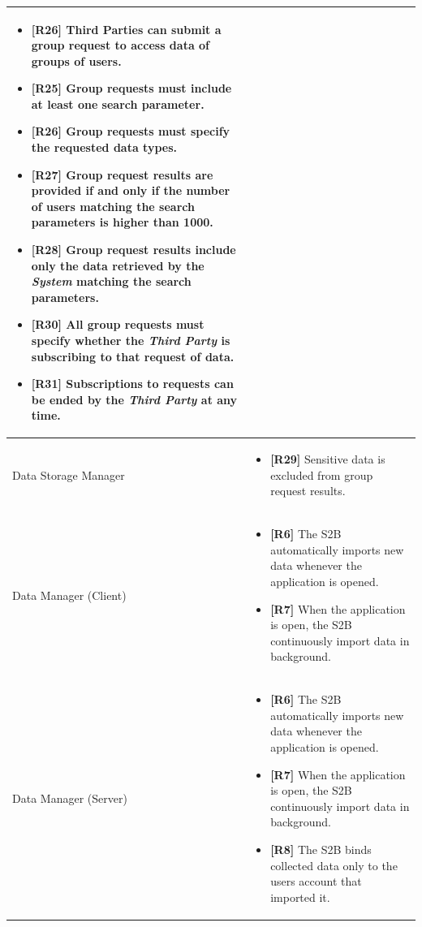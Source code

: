 \documentclass[titlepage]{article}
\begin{document}
\begin{longtable}{| p{5 cm} | p{8 cm} |}
\begin{itemize}
			\item {\bf [R26]} Third Parties can submit a group request to access data of groups of users. 
			\item {\bf [R25]} Group requests must include at least one search parameter. 
			\item {\bf [R26]} Group requests must specify the requested data types. 
			\item {\bf [R27]} Group request results are provided if and only if the number of users matching the search parameters is higher than 1000. 
			\item {\bf [R28]} Group request results include only the data retrieved by the {\it System} matching the search parameters. 
			\item {\bf [R30]} All group requests must specify whether the {\it Third Party} is subscribing to that request of data. 
			\item {\bf [R31]} Subscriptions to requests can be ended by the {\it Third Party} at any time.
		\end{itemize}		
		\\	 \hline
		\newline Data Storage Manager & 
		\begin{itemize}
			\item {\bf [R29]} Sensitive data is excluded from group request results. 
		\end{itemize}		
		\\	 \hline	
		\newline Data Manager (Client) & 
		\begin{itemize}
			\item {\bf [R6]} The S2B automatically imports new data whenever the application is opened.
			\item {\bf [R7]} When the application is open, the S2B continuously import data in background.
		\end{itemize}		
		\\	 \hline	
		\newline Data Manager (Server) & 
		\begin{itemize}
			\item {\bf [R6]} The S2B automatically imports new data whenever the application is opened.
			\item {\bf [R7]} When the application is open, the S2B continuously import data in background.
			\item {\bf [R8]} The S2B binds collected data only to the user\textsc{\char13}s account that imported it. 
		\end{itemize}		

\end{longtable}
\end{document}

